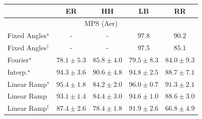 \begin{tabular}{l|cccc|}
\toprule
            & ER & HH & LB & RR \\
\midrule
\multicolumn{5}{c}{\rule{0pt}{8pt}MPS (Aer)} \\
\midrule
Fixed Angles$^\star$ & {\cellcolor[HTML]{000000}} \color[HTML]{F1F1F1} {\cellcolor{white}} \color{black} - & {\cellcolor[HTML]{000000}} \color[HTML]{F1F1F1} {\cellcolor{white}} \color{black} - & {\cellcolor[HTML]{520150}} \color[HTML]{F1F1F1} $97.8$ & {\cellcolor[HTML]{84248A}} \color[HTML]{F1F1F1} $90.2$ \\
Fixed Angles$^\dagger$ & {\cellcolor[HTML]{000000}} \color[HTML]{F1F1F1} {\cellcolor{white}} \color{black} - & {\cellcolor[HTML]{000000}} \color[HTML]{F1F1F1} {\cellcolor{white}} \color{black} - & {\cellcolor[HTML]{550253}} \color[HTML]{F1F1F1} $97.5$ & {\cellcolor[HTML]{894FA3}} \color[HTML]{F1F1F1} $85.1$ \\
Fourier$^\star$ & {\cellcolor[HTML]{8C81BC}} \color[HTML]{F1F1F1} $78.1\pm 5.3$ & {\cellcolor[HTML]{8949A1}} \color[HTML]{F1F1F1} $85.8\pm 4.0$ & {\cellcolor[HTML]{8C78B7}} \color[HTML]{F1F1F1} $79.5\pm 8.3$ & {\cellcolor[HTML]{8A56A7}} \color[HTML]{F1F1F1} $84.0\pm 9.3$ \\
Interp.$^\star$ & {\cellcolor[HTML]{710A6D}} \color[HTML]{F1F1F1} $94.3\pm 3.6$ & {\cellcolor[HTML]{832088}} \color[HTML]{F1F1F1} $90.6\pm 4.8$ & {\cellcolor[HTML]{6E096A}} \color[HTML]{F1F1F1} $94.8\pm 2.5$ & {\cellcolor[HTML]{863092}} \color[HTML]{F1F1F1} $88.7\pm 7.1$ \\
Linear Ramp$^\star$ & {\cellcolor[HTML]{670864}} \color[HTML]{F1F1F1} $95.4\pm 1.8$ & {\cellcolor[HTML]{8A55A7}} \color[HTML]{F1F1F1} $84.2\pm 2.0$ & {\cellcolor[HTML]{62065F}} \color[HTML]{F1F1F1} $96.0\pm 0.7$ & {\cellcolor[HTML]{831A83}} \color[HTML]{F1F1F1} $91.3\pm 2.1$ \\
Linear Ramp & {\cellcolor[HTML]{7C0E78}} \color[HTML]{F1F1F1} $93.1\pm 1.4$ & {\cellcolor[HTML]{8A52A5}} \color[HTML]{F1F1F1} $84.4\pm 3.0$ & {\cellcolor[HTML]{6F0A6B}} \color[HTML]{F1F1F1} $94.6\pm 1.0$ & {\cellcolor[HTML]{863293}} \color[HTML]{F1F1F1} $88.6\pm 3.0$ \\
Linear Ramp$^\dagger$ & {\cellcolor[HTML]{873D9A}} \color[HTML]{F1F1F1} $87.4\pm 2.6$ & {\cellcolor[HTML]{8C80BB}} \color[HTML]{F1F1F1} $78.4\pm 1.8$ & {\cellcolor[HTML]{821580}} \color[HTML]{F1F1F1} $91.9\pm 2.6$ & {\cellcolor[HTML]{AEC7E0}} \color[HTML]{000000} $66.8\pm 4.9$ \\

\end{tabular}
